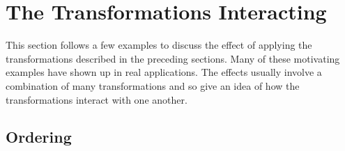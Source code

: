% 




\section{The Transformations Interacting}

This section follows a few examples to discuss the effect of applying the
transformations described in the preceding sections. Many of these motivating
examples have shown up in real applications. The effects usually involve a
combination of many transformations and so give an idea of how the
transformations interact with one another.

\subsection{Ordering}

